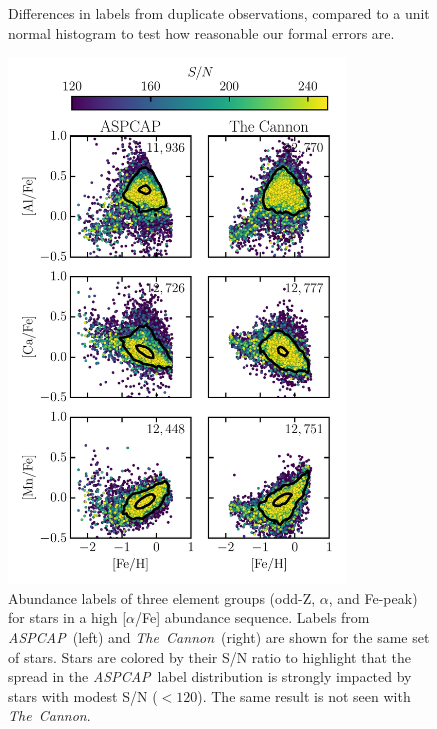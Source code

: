 \documentclass[12pt,preprint]{aastex}
\newcommand{\project}[1]{\textsl{#1}}
\newcommand{\TheCannon}{\project{The~Cannon}}
\newcommand{\acronym}[1]{{\small{#1}}}
\newcommand{\aspcap}{\project{\acronym{ASPCAP}}}
\begin{document}
\begin{figure}[p]
\centering
\caption{Differences in labels from duplicate observations, compared to a unit normal histogram to test how reasonable our formal errors are.
\label{fig:duplicate-observations}}
\end{figure}





\begin{figure}[p]
\centering
\includegraphics[width=0.8\textwidth]{high-alpha-sequence.pdf}
\caption{Abundance labels of three element groups (odd-Z, $\alpha$, and Fe-peak) for stars in a high [$\alpha$/Fe] abundance sequence. Labels from \aspcap\ (left) and \TheCannon\ (right) are shown for the same set of stars. Stars are colored by their S/N ratio to highlight that the spread in the \aspcap\ label distribution is strongly impacted by stars with modest S/N ($<120$). The same result is not seen with \TheCannon.\label{fig:high-alpha-sequence}}
\end{figure}

\clearpage
\end{document}
